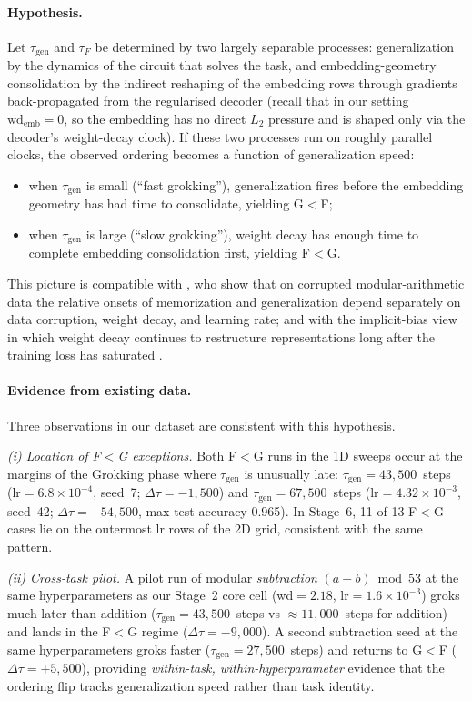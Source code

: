\documentclass{article}
\newcommand{\taug}{\tau_{\mathrm{gen}}}
\newcommand{\tauf}{\tau_{F}}
\newcommand{\Dtau}{\Delta\tau}
\begin{document}
\paragraph{Hypothesis.}
Let $\taug$ and $\tauf$ be determined by two largely separable
processes: generalization by the dynamics of the circuit that
solves the task, and embedding-geometry consolidation by the
indirect reshaping of the embedding rows through gradients
back-propagated from the regularised decoder (recall that in our
setting $\mathrm{wd}_{\mathrm{emb}}{=}0$, so the embedding has no
direct $L_2$ pressure and is shaped only via the decoder's
weight-decay clock).
If these two processes run on roughly parallel clocks, the observed
ordering becomes a function of generalization speed:
\begin{itemize}
  \item when $\taug$ is small (``fast grokking''), generalization
    fires before the embedding geometry has had time to consolidate,
    yielding G$<$F;
  \item when $\taug$ is large (``slow grokking''), weight decay has
    enough time to complete embedding consolidation first, yielding
    F$<$G.
\end{itemize}
This picture is compatible with \citet{doshi2024grok}, who show that
on corrupted modular-arithmetic data the relative onsets of
memorization and generalization depend separately on data corruption,
weight decay, and learning rate; and with the implicit-bias view in
which weight decay continues to restructure representations long
after the training loss has saturated \citep{soudry2018implicit,
galanti2024sgd,andriushchenko2023need}.

\paragraph{Evidence from existing data.}
Three observations in our dataset are consistent with this hypothesis.

\emph{(i) Location of F$<$G exceptions.}
Both F$<$G runs in the 1D sweeps occur at the margins of the Grokking
phase where $\taug$ is unusually late: $\taug{=}43{,}500$~steps
(lr$=6.8\!\times\!10^{-4}$, seed~7; $\Dtau=-1{,}500$) and
$\taug{=}67{,}500$~steps (lr$=4.32\!\times\!10^{-3}$, seed~42;
$\Dtau=-54{,}500$, max test accuracy 0.965).
In Stage~6, 11 of 13 F$<$G cases lie on the outermost lr rows of
the 2D grid, consistent with the same pattern.

\emph{(ii) Cross-task pilot.}
A pilot run of modular \emph{subtraction} $(a{-}b)\bmod 53$ at the
same hyperparameters as our Stage~2 core cell
(wd$=2.18$, lr$=1.6\!\times\!10^{-3}$) groks much later than addition
($\taug{=}43{,}500$~steps vs $\approx 11{,}000$~steps for addition)
and lands in the F$<$G regime ($\Dtau{=}{-}9{,}000$).
A second subtraction seed at the same hyperparameters groks faster
($\taug{=}27{,}500$~steps) and returns to G$<$F ($\Dtau{=}{+}5{,}500$),
providing \emph{within-task, within-hyperparameter} evidence that
the ordering flip tracks generalization speed rather than task
identity.
\end{document}
